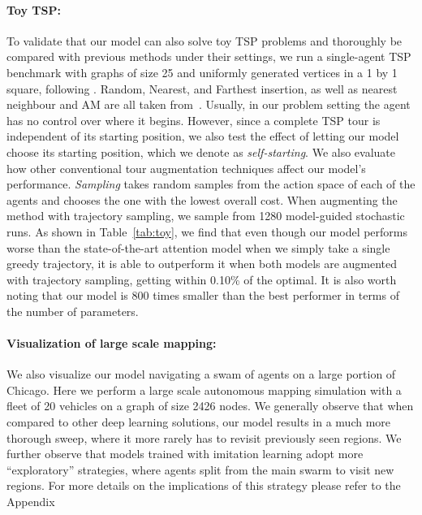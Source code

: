 \paragraph{Toy TSP:} To validate that our model can also solve toy TSP problems and thoroughly be
compared with previous methods under their settings, we run a single-agent TSP benchmark with graphs
of size 25 and uniformly generated vertices in a 1 by 1 square, following \citep{am}. Random,
Nearest, and Farthest insertion, as well as nearest neighbour and AM are all taken from~\cite{am}.
Usually, in our problem setting the agent has no control over where it begins. However, since a
complete TSP tour is independent of its starting position, we also test the effect of letting our
model choose its starting position, which we denote as \emph{self-starting}. We also evaluate how
other conventional tour augmentation techniques affect our model's performance.
\emph{Sampling} takes random samples from the action space of each of the agents and chooses the
one with the lowest overall cost. When augmenting the method with trajectory sampling, we sample
from 1280 model-guided stochastic runs.
As shown in Table~\ref{tab:toy}, we find that even though our model performs worse than the state-of-the-art attention model when we simply take a single greedy trajectory, it is able to outperform it
when both models are augmented with trajectory sampling, getting within 0.10\% of the optimal. It is
also worth noting that our model is 800 times smaller than the best performer in terms of the number
of parameters.

\vspace{-0.1in}
\paragraph{Visualization of large scale mapping:} We also visualize our model navigating a swam of
agents on a large portion of Chicago. Here we perform a large scale autonomous mapping simulation
with a fleet of 20 vehicles on a graph of size 2426 nodes.
We generally observe that when compared to other deep learning
solutions, our model results in a much more thorough sweep, where it more rarely has to revisit
previously seen regions. We further observe that models trained with imitation learning  adopt more ``exploratory'' strategies, where
agents split from the main swarm to visit new regions. For more details on the implications of this strategy
please refer to the Appendix


